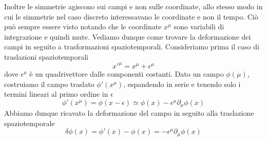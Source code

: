 Inoltre le simmetrie agiscono sui campi e non sulle coordinate, allo stesso modo in cui le simmetrie nel caso discreto interessavano le coordinate e non il tempo. Ciò può sempre essere visto notando che le coordinate $x^\mu$ sono variabili di integrazione e quindi mute. Vediamo dunque come trovare la deformazione dei campi in seguito a trasformazioni spaziotemporali. Consideriamo prima il caso di traslazioni spaziotemporali
\begin{equation*}
    x'^\mu = x^\mu + \epsilon^\mu
\end{equation*} 
    dove $\epsilon^\mu$ è un quadrivettore dalle componenti costanti. Dato un campo $\phi(\mu)$, costruiamo il campo traslato $\phi'(x^\mu)$, espandendo in serie e tenendo solo i termini lineari al primo ordine in $\epsilon$
\begin{equation*}
    \phi'(x^\mu) = \phi(x - \epsilon) \simeq \phi(x) - \epsilon^\mu \partial_\mu \phi(x)
\end{equation*}
    Abbiamo dunque ricavato la deformazione del campo in seguito alla traslazione spaziotemporale 
\begin{equation*}
    \delta \phi(x) = \phi'(x) - \phi(x) = -\epsilon^\mu \partial_\mu \phi (x)
\end{equation*}

